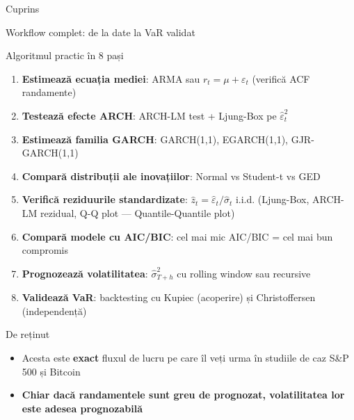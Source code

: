 \documentclass[9pt, aspectratio=169, t]{beamer}
\begin{document}
\begin{frame}{Cuprins}
    \small
    \vspace{-0.2cm}
    \tableofcontents[currentsection]
\end{frame}

\begin{frame}{Workflow complet: de la date la VaR validat}
    \small
        \vspace{-0.2cm}
        \begin{block}{Algoritmul practic în 8 pași}
            \begin{enumerate}\setlength{\itemsep}{1pt}
                \item \textbf{Estimează ecuația mediei}: ARMA sau $r_t = \mu + \varepsilon_t$ (verifică ACF randamente)
                \item \textbf{Testează efecte ARCH}: ARCH-LM test + Ljung-Box pe $\hat{\varepsilon}_t^2$
                \item \textbf{Estimează familia GARCH}: GARCH(1,1), EGARCH(1,1), GJR-GARCH(1,1)
                \item \textbf{Compară distribuții ale inovațiilor}: Normal vs Student-t vs GED
                \item \textbf{Verifică reziduurile standardizate}: $\hat{z}_t = \hat{\varepsilon}_t / \hat{\sigma}_t$ i.i.d. (Ljung-Box, ARCH-LM rezidual, Q-Q plot --- Quantile-Quantile plot)
                \item \textbf{Compară modele cu AIC/BIC}: cel mai mic AIC/BIC = cel mai bun compromis
                \item \textbf{Prognozează volatilitatea}: $\hat{\sigma}_{T+h}^2$ cu rolling window sau recursive
                \item \textbf{Validează VaR}: backtesting cu Kupiec (acoperire) și Christoffersen (independență)
            \end{enumerate}
        \end{block}
        \vspace{-1.5mm}
        \begin{alertblock}{De reținut}
            \begin{itemize}
                \item Acesta este \textbf{exact} fluxul de lucru pe care îl veți urma în studiile de caz S\&P 500 și Bitcoin
                \item \textbf{Chiar dacă randamentele sunt greu de prognozat, volatilitatea lor este adesea prognozabilă}
            \end{itemize}
        \end{alertblock}
\end{frame}
\end{document}

